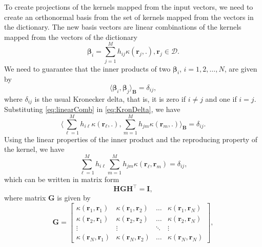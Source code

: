 To create projections of the kernels mapped from the input vectors, we need to create an orthonormal basis from the set of kernels mapped from the vectors in the dictionary. The new basis vectors are linear combinations of the kernels mapped from the vectors of the dictionary
\begin{equation}
    \boldsymbol{\beta}_i = \sum_{j=1}^{M}h_{ij}\kappa(\mathbf{r}_j,.), \mathbf{r}_j \in \mathcal{D}.\label{eq:linearComb}
\end{equation}
We need to guarantee that the inner products of two $\boldsymbol{\beta}_i$, $i=1,2,\dots,N$, are given by
\begin{equation}
    \langle \boldsymbol{\beta}_i, \boldsymbol{\beta}_j \rangle_{\mathbf{B}} = \delta_{ij},\label{eq:KronDelta}
\end{equation}
where $\delta_{ij}$ is the usual Kronecker delta, that is, it is zero if $i \neq j$ and one if $i = j$.
Substituting \eqref{eq:linearComb} in \eqref{eq:KronDelta}, we have
\begin{equation}
    \langle \sum_{\ell=1}^{M}h_{i\ell}\kappa(\mathbf{r}_\ell,.), \sum_{m=1}^{M}h_{jm}\kappa(\mathbf{r}_m,.) \rangle_{\mathbf{B}} = \delta_{ij}.
\end{equation}
Using the linear properties of the inner product and the reproducing property of the kernel, we have
\begin{equation}
    \sum_{\ell=1}^{M}h_{i\ell}\sum_{m=1}^{M}h_{jm}\kappa(\mathbf{r}_\ell,\mathbf{r}_m) = \delta_{ij},
\end{equation}
which can be written in matrix form
\begin{equation}
    \mathbf{H} \mathbf{G} \mathbf{H}^{\top} = \mathbf{I},
\end{equation}
where matrix $\mathbf{G}$ is given by
\begin{equation}
    \mathbf{G} = \left[\begin{matrix}
        \kappa(\mathbf{r}_1,\mathbf{r}_1) & \kappa(\mathbf{r}_1,\mathbf{r}_2) & \dots & \kappa(\mathbf{r}_1,\mathbf{r}_N)\\
        \kappa(\mathbf{r}_2,\mathbf{r}_1) & \kappa(\mathbf{r}_2,\mathbf{r}_2) & \dots & \kappa(\mathbf{r}_2,\mathbf{r}_N)\\
        \vdots & \vdots & \ddots & \vdots\\
        \kappa(\mathbf{r}_N,\mathbf{r}_1) & \kappa(\mathbf{r}_N,\mathbf{r}_2) & \dots & \kappa(\mathbf{r}_N,\mathbf{r}_N)
    \end{matrix}\right],
\end{equation}
